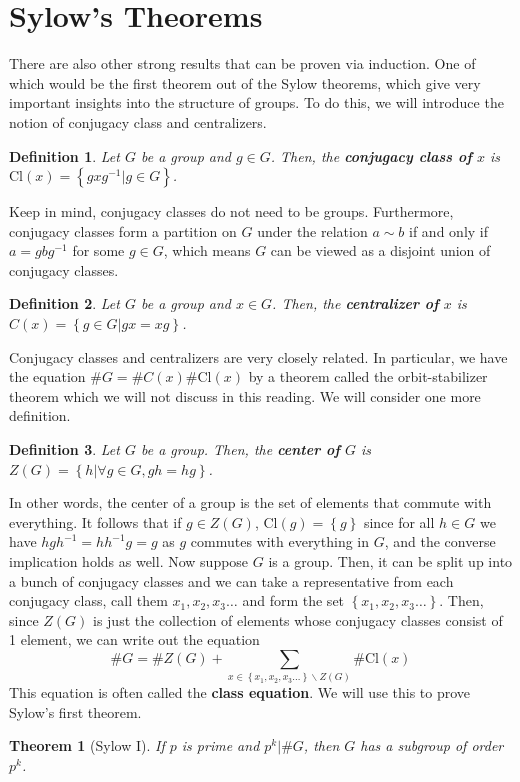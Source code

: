 \documentclass[letterpaper,12pt]{article}
\newcommand{\set}[1]{\left\{ #1 \right\}}
\newtheorem{theorem}{Theorem}[section]
\newtheorem{definition}{Definition}[section]
\begin{document}
\section{Sylow's Theorems} 
    There are also other strong results that can be proven via induction. One of which would be the first theorem out of the Sylow theorems, which give very important insights into the structure of groups. To do this, we will introduce the notion of conjugacy class and centralizers.
    \begin{definition}
        Let $G$ be a group and $g \in G$. Then, the \textbf{conjugacy class of} $x$ is $\mathrm{Cl}(x) = \set{gxg^{-1}|g \in G}$.
    \end{definition}
    Keep in mind, conjugacy classes do not need to be groups. Furthermore, conjugacy classes form a partition on $G$ under the relation $a \sim b$ if and only if $a = gbg^{-1}$ for some $g \in G$, which means $G$ can be viewed as a disjoint union of conjugacy classes.
    \begin{definition}
        Let $G$ be a group and $x \in G$. Then, the \textbf{centralizer of} $x$ is $C(x)=\set{g \in G | gx = xg}$.
    \end{definition}
    Conjugacy classes and centralizers are very closely related. In particular, we have the equation $\# G = \#C(x)\#\mathrm{Cl}(x)$ by a theorem called the orbit-stabilizer theorem which we will not discuss in this reading. We will consider one more definition.
    \begin{definition}
        Let $G$ be a group. Then, the \textbf{center of} $G$ is $Z(G) = \set{h | \forall g \in G, gh = hg}$.
    \end{definition}
    In other words, the center of a group is the set of elements that commute with everything. It follows that if $g \in Z(G)$, $\mathrm{Cl}(g) = \set{g}$ since for all $h \in G$ we have $hgh^{-1} = hh^{-1}g = g$ as $g$ commutes with everything in $G$, and the converse implication holds as well. Now suppose $G$ is a group. Then, it can be split up into a bunch of conjugacy classes and we can take a representative from each conjugacy class, call them $x_1,x_2,x_3\ldots$ and form the set $\set{x_1,x_2,x_3\ldots}$. Then, since $Z(G)$ is just the collection of elements whose conjugacy classes consist of 1 element, we can write out the equation
    $$\# G = \#Z(G) + \sum_{x \in \set{x_1,x_2,x_3\ldots}\backslash Z(G)} \# \mathrm{Cl}(x)$$
    This equation is often called the \textbf{class equation}. We will use this to prove Sylow's first theorem.
    \begin{theorem}[Sylow I]
        If $p$ is prime and $p^k | \#G$, then $G$ has a subgroup of order $p^k$.
    \end{theorem}
\end{document}

